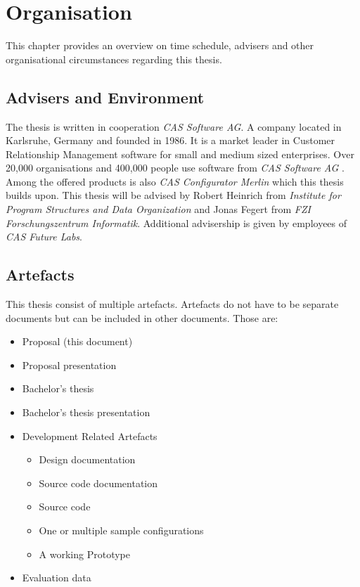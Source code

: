 \chapter{Organisation}
\label{ch:Organisation}

This chapter provides an overview on time schedule, advisers and other organisational circumstances regarding this thesis.

\section{Advisers and Environment}
\label{sec:Organisation:AdvisersAndEnvironment}

The thesis is written in cooperation \emph{CAS Software AG}. A company located in Karlsruhe, Germany and founded in 1986. It is a market leader in Customer Relationship Management software for small and medium sized enterprises. Over 20,000 organisations and 400,000 people use software from \emph{CAS Software AG} \cite{CASSoftwareAG}. Among the offered products is also \emph{CAS Configurator Merlin} which this thesis builds upon. This thesis will be advised by Robert Heinrich from \emph{Institute for Program Structures and Data Organization} and Jonas Fegert from \emph{FZI Forschungszentrum Informatik}. Additional advisership is given by employees of \emph{CAS Future Labs}.

\section{Artefacts}
\label{sec:Organisation:Artefacts}

This thesis consist of multiple artefacts. Artefacts do not have to be separate documents but can be included in other documents. Those are:
\begin{itemize}
    \item Proposal (this document)
    \item Proposal presentation
    \item Bachelor's thesis
    \item Bachelor's thesis presentation
    \item Development Related Artefacts
    \begin{itemize}
        \item Design documentation
        \item Source code documentation
        \item Source code
        \item One or multiple sample configurations
        \item A working Prototype
    \end{itemize}
    \item Evaluation data
\end{itemize}

